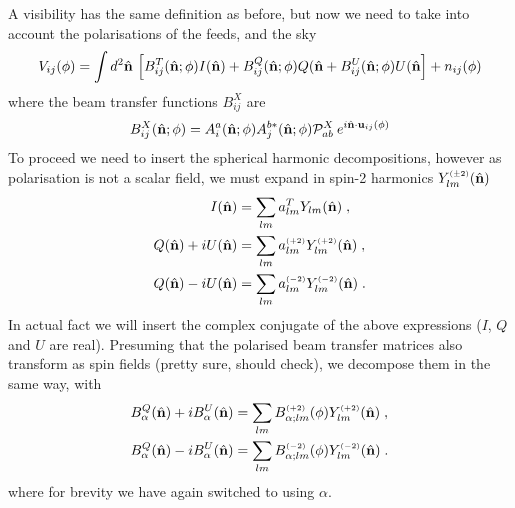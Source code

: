 \documentclass[onecolumn]{revtex4}
\begin{document}
A visibility has the same definition as before, but now we need to take into
account the polarisations of the feeds, and the sky
\begin{equation}
\label{eq:vispol}
V_{ij}(\phi) = \int d^2\hat{\mathbf{n}} \, \left[ B^T_{ij}(\hat{\mathbf{n}}; \phi) I(\hat{\mathbf{n}}) +
  B^Q_{ij}(\hat{\mathbf{n}}; \phi) Q(\hat{\mathbf{n}} + B^U_{ij}(\hat{\mathbf{n}}; \phi) U(\hat{\mathbf{n}} \right]+ n_{ij}(\phi)
\end{equation}
where the beam transfer functions $B^X_{ij}$ are
\begin{equation}
B^X_{ij}(\hat{\mathbf{n}}; \phi) = A_i^a(\hat{\mathbf{n}}; \phi) A_j^{b *}(\hat{\mathbf{n}}; \phi)
\mathcal{P}^X_{ab} \:e^{i \hat{\mathbf{n}} \cdot
  \mathbf{u}_{ij}(\phi)} 
\end{equation}
To proceed we need to insert the spherical harmonic decompositions, however as
polarisation is not a scalar field, we must expand in spin-2 harmonics
$Y_{lm}^{\scriptscriptstyle \left(\pm 2\right)}(\hat{\mathbf{n}})$
\begin{align}
I(\hat{\mathbf{n}}) & = \sum_{lm} a^T_{lm} Y_{lm}(\hat{\mathbf{n}}) \; ,\\
Q(\hat{\mathbf{n}}) + i U(\hat{\mathbf{n}}) & = \sum_{lm} a^{\scriptscriptstyle \left(+2\right)}_{lm}
Y^{\scriptscriptstyle \left(+2\right)}_{lm}(\hat{\mathbf{n}}) \; ,\\
Q(\hat{\mathbf{n}}) - i U(\hat{\mathbf{n}}) & = \sum_{lm} a^{\scriptscriptstyle \left(-2\right)}_{lm}
Y^{\scriptscriptstyle \left(-2\right)}_{lm}(\hat{\mathbf{n}}) \; .
\end{align}
In actual fact we will insert the complex conjugate of the above expressions
($I$, $Q$ and $U$ are real). Presuming that the polarised beam transfer matrices
also transform as spin fields (pretty sure, should check), we decompose them in
the same way, with
\begin{align}
B^Q_{\alpha}(\hat{\mathbf{n}}) + i B^U_{\alpha}(\hat{\mathbf{n}}) & = \sum_{lm}
B^{\scriptscriptstyle \left(+2\right)}_{\alpha;lm} (\phi)
Y^{\scriptscriptstyle \left(+2\right)}_{lm}(\hat{\mathbf{n}}) \; ,\\
B^Q_{\alpha}(\hat{\mathbf{n}}) - i B^U_{\alpha}(\hat{\mathbf{n}}) & = \sum_{lm}
B^{\scriptscriptstyle \left(-2\right)}_{\alpha;lm} (\phi)
Y^{\scriptscriptstyle \left(-2\right)}_{lm}(\hat{\mathbf{n}}) \; .
\end{align}
where for brevity we have again switched to using $\alpha$.
\end{document}
